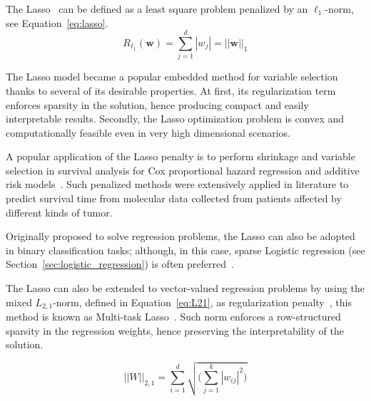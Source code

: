 			The Lasso~\cite{tibshirani1996regression} can be defined as a least square problem penalized by an $\ell_1$-norm, see Equation~\eqref{eq:lasso}.
			\begin{equation}\label{eq:lasso}
				R_{\mbox{$\ell_1$}}(\bm{w}) = \sum_{j=1}^d |w_j| = ||\bm{w}||_1
			\end{equation}

			The Lasso model became a popular embedded method for variable selection~\cite{guyon2003introduction} thanks to several of its desirable properties. At first, its regularization term enforces sparsity in the solution, hence producing compact and easily interpretable results. Secondly, the Lasso optimization problem is convex and computationally feasible even in very high dimensional scenarios.

			A popular application of the Lasso penalty is to perform shrinkage and variable selection in survival analysis for Cox proportional hazard regression \cite{tang2017spike, gui2005penalized, tibshirani1997lasso} and additive risk models~\cite{ma2007additive}. Such penalized methods were extensively applied in literature to predict survival time from molecular data collected from patients affected by different kinds of tumor.

			Originally proposed to solve regression problems, the Lasso can also be adopted in binary classification tasks; although, in this case, sparse Logistic regression (see Section~\eqref{sec:logistic_regression}) is often preferred~\cite{tong2009genome}.




			The Lasso can also be extended to vector-valued regression problems by using the mixed $L_{2,1}$-norm, defined in Equation~\eqref{eq:L21}, as regularization penalty~\cite{gramfort2012mixed}, this method is known as Multi-task Lasso~\cite{lee2010adaptive}. Such norm enforces a row-structured sparsity in the regression weights, hence preserving the interpretability of the solution.

			\begin{equation}\label{eq:L21}
				||W||_{2,1} = \sum_{i=1}^d\sqrt{\bigg(\sum_{j=1}^k |w_{ij}|^2\bigg)}
			\end{equation}

